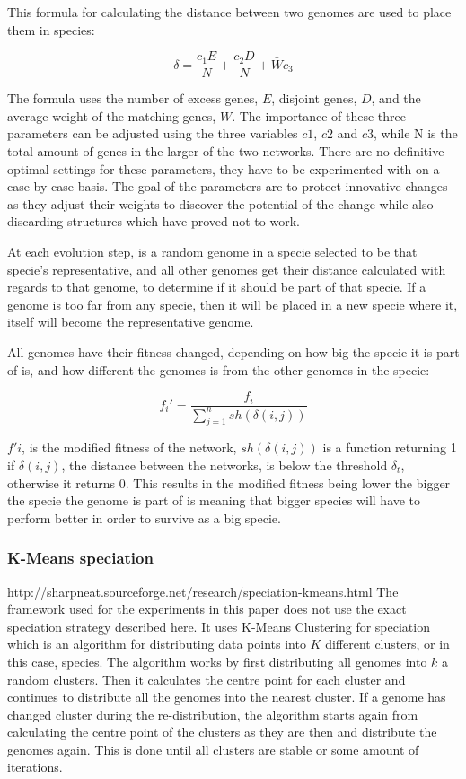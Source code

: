 This formula for calculating the distance between two genomes are used to place them in species: 

$$\delta = \frac{c_1E}{N} + \frac{c_2D}{N} + \bar W c_3$$

The formula uses the number of excess genes, $E$, disjoint genes, $D$, and the average weight of the matching genes, $W$. The importance of these three parameters can be adjusted using the three variables $c1$, $c2$ and $c3$, while N is the total amount of genes in the larger of the two networks. There are no definitive optimal settings for these parameters, they have to be experimented with on a case by case basis. The goal of the parameters are to protect innovative changes as they adjust their weights to discover the potential of the change while also discarding structures which have proved not to work. 

At each evolution step, is a random genome in a specie selected to be that specie's representative, and all other genomes get their distance calculated with regards to that genome, to determine if it should be part of that specie. If a genome is too far from any specie, then it will be placed in a new specie where it, itself will become the representative genome.

All genomes have their fitness changed, depending on how big the specie it is part of is, and how different the genomes is from the other genomes in the specie:

$$f_i' = \frac{f_i}{\sum^n_{j=1} sh(\delta(i,j))}$$

$f'i$, is the modified fitness of the network, $sh(\delta(i,j))$ is a function returning 1 if $\delta(i,j)$, the distance between the networks, is below the threshold $\delta_t$, otherwise it returns 0. This results in the modified fitness being lower the bigger the specie the genome is part of is meaning that bigger species will have to perform better in order to survive as a big specie.

\subsubsection{K-Means speciation} 
http://sharpneat.sourceforge.net/research/speciation-kmeans.html
The framework used for the experiments in this paper does not use the exact speciation strategy described here. It uses K-Means Clustering for speciation which is an algorithm for distributing data points into $K$ different clusters, or in this case, species. The algorithm works by first distributing all genomes into $k$ a random clusters. Then it calculates the centre point for each cluster and continues to distribute all the genomes into the nearest cluster. If a genome has changed cluster during the re-distribution, the algorithm starts again from calculating the centre point of the clusters as they are then and distribute the genomes again. This is done until all clusters are stable or some amount of iterations.

